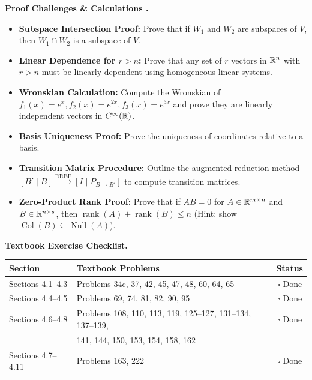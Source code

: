 \documentclass{natsirt}
\newcounter{topic}[section]
\newenvironment{challengebox}[1][]{%
    \begin{redbox}[#1]\refstepcounter{topic}\textbf{Proof Challenges \& Calculations \thesection.\thetopic}%
}{\end{redbox}}
\newenvironment{reviewbox}[1][]{\begin{whitebox}[#1]\textbf{Textbook Exercise Checklist. }}{\end{whitebox}}
\newcommand{\citem}{\item[$\square$]}
\newcommand{\Null}{\operatorname{Null}}
\newcommand{\Col}{\operatorname{Col}}
\newcommand{\rank}{\operatorname{rank}}
\begin{document}
\begin{challengebox}
    \begin{itemize}
        \citem \textbf{Subspace Intersection Proof:} Prove that if $W_1$ and $W_2$ are subspaces of $V$, then $W_1 \cap W_2$ is a subspace of $V$.
        \citem \textbf{Linear Dependence for $r > n$:} Prove that any set of $r$ vectors in $\mathbb{R}^n$ with $r > n$ must be linearly dependent using homogeneous linear systems.
        \citem \textbf{Wronskian Calculation:} Compute the Wronskian of $f_1(x) = e^x, f_2(x) = e^{2x}, f_3(x) = e^{3x}$ and prove they are linearly independent vectors in $C^\infty(\mathbb{R})$.
        \citem \textbf{Basis Uniqueness Proof:} Prove the uniqueness of coordinates relative to a basis.
        \citem \textbf{Transition Matrix Procedure:} Outline the augmented reduction method $[B' \mid B] \xrightarrow{\text{RREF}} [I \mid P_{B \to B'}]$ to compute transition matrices.
        \citem \textbf{Zero-Product Rank Proof:} Prove that if $AB = 0$ for $A \in \mathbb{R}^{m \times n}$ and $B \in \mathbb{R}^{n \times s}$, then $\rank(A) + \rank(B) \le n$ (Hint: show $\Col(B) \subseteq \Null(A)$).
    \end{itemize}
\end{challengebox}

\begin{reviewbox}
    \begin{center}
    \begin{tabular}{|l|l|c|}
        \hline
        \textbf{Section} & \textbf{Textbook Problems} & \textbf{Status} \\
        \hline
        Sections 4.1--4.3 & Problems 34c, 37, 42, 45, 47, 48, 60, 64, 65 & $\square$ Done \\
        Sections 4.4--4.5 & Problems 69, 74, 81, 82, 90, 95 & $\square$ Done \\
        Sections 4.6--4.8 & Problems 108, 110, 113, 119, 125--127, 131--134, 137--139, & $\square$ Done \\
                          & 141, 144, 150, 153, 154, 158, 162 & \\
        Sections 4.7--4.11& Problems 163, 222 & $\square$ Done \\
        \hline
    \end{tabular}
    \end{center}
\end{reviewbox}


\end{document}

